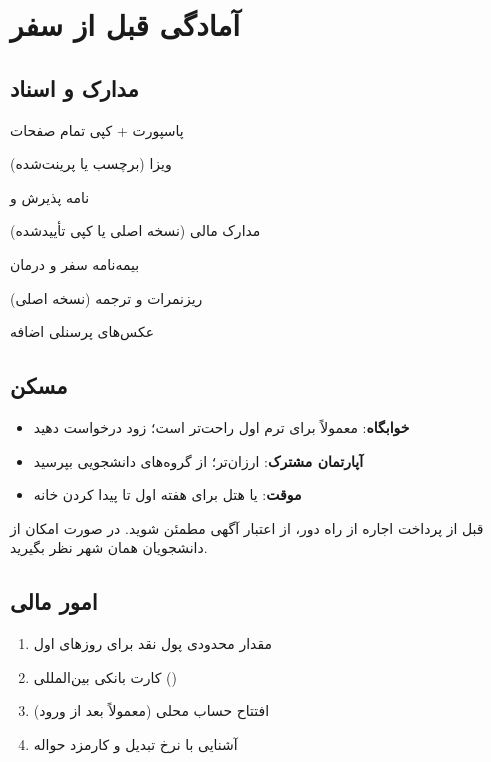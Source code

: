 \chapter{آمادگی قبل از سفر}
\label{ch:preparation}

\section{مدارک و اسناد}

\begin{checklistbox}[title={مدارکی که باید همراه داشته باشید}]
  \begin{checklist}
    \item پاسپورت + کپی تمام صفحات
    \item ویزا (برچسب یا  پرینت‌شده)
    \item نامه پذیرش و 
    \item مدارک مالی (نسخه اصلی یا کپی تأییدشده)
    \item بیمه‌نامه سفر و درمان
    \item ریزنمرات و ترجمه (نسخه اصلی)
    \item عکس‌های پرسنلی اضافه
  \end{checklist}
\end{checklistbox}

\section{مسکن}

\begin{itemize}
  \item \textbf{خوابگاه}: معمولاً برای ترم اول راحت‌تر است؛ زود درخواست دهید
  \item \textbf{آپارتمان مشترک}: ارزان‌تر؛ از گروه‌های دانشجویی بپرسید
  \item \textbf{موقت}:  یا هتل برای هفته اول تا پیدا کردن خانه
\end{itemize}

\begin{tipbox}
  قبل از پرداخت اجاره از راه دور، از اعتبار آگهی مطمئن شوید.
  در صورت امکان از دانشجویان همان شهر نظر بگیرید.
\end{tipbox}

\section{امور مالی}

\begin{enumerate}
  \item مقدار محدودی پول نقد برای روزهای اول
  \item کارت بانکی بین‌المللی ()
  \item افتتاح حساب محلی (معمولاً بعد از ورود)
  \item آشنایی با نرخ تبدیل و کارمزد حواله
\end{enumerate}

